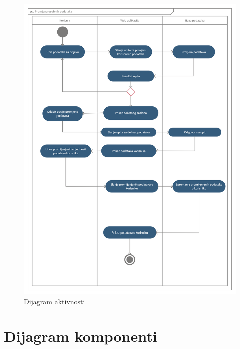 		\begin{figure}[H]
			\hspace*{-1.5cm}
			\includegraphics[scale=0.25]{dijagrami/dijagram_aktivnosti.png} %
			\centering
			\caption{Dijagram aktivnosti}
			\label{fig:promjene}
		\end{figure}
			
			\eject
		\section{Dijagram komponenti}
		
